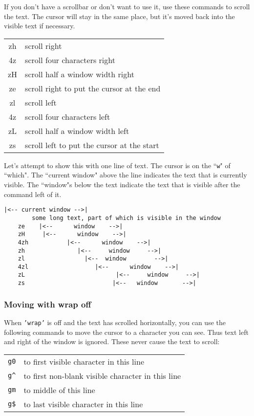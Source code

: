 If you don't have a scrollbar or don't want to use it, use these commands to scroll the text.
The cursor will stay in the same place, but it's moved back into the visible text if necessary.

\begin{center} \begin{tabular}{c l}
				zh & scroll right \\
				4z & scroll four characters right \\
				zH & scroll half a window width right \\
				ze & scroll right to put the cursor at the end \\
				zl & scroll left \\
				4z & scroll four characters left \\
				zL & scroll half a window width left \\
				zs & scroll left to put the cursor at the start \\
\end{tabular} \end{center}

Let's attempt to show this with one line of text.
The cursor is on the ``\texttt{w}" of ``which".
The ``current window" above the line indicates the text that is currently visible.
The ``window"s below the text indicate the text that is visible after the command left of it.

\begin{Verbatim}[samepage=true]
                      |<-- current window -->|
        some long text, part of which is visible in the window
    ze    |<--      window    -->|
    zH     |<--      window    -->|
    4zh           |<--      window    -->|
    zh               |<--     window     -->|
    zl                 |<--  window        -->|
    4zl                   |<--      window    -->|
    zL                          |<--     window     -->|
    zs                         |<--   window       -->|
\end{Verbatim}

\subsubsection{Moving with wrap off}
When \texttt{'wrap'} is off and the text has scrolled horizontally, you can use the following commands to move the cursor to a character you can see.
Thus text left and right of the window is ignored.
These never cause the text to scroll:

\begin{center} \begin{tabular}{c l}
				\texttt{g0} & to first visible character in this line \\
				\texttt{g\^{}} & to first non-blank visible character in this line \\
				\texttt{gm} & to middle of this line \\
				\texttt{g\$} & to last visible character in this line \\
\end{tabular} \end{center}

